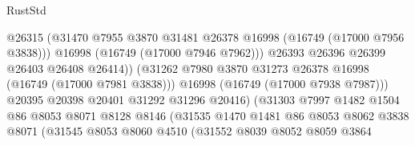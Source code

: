 \begin{lexlean}{RustStd}
\begin{coremodule}
                                          @26315
                                          (@31470
                                            @7955
                                            @3870
                                            @31481
                                            @26378
                                            @16998
                                            (@16749 (@17000 @7956 @3838)))
                                          @16998
                                          (@16749 (@17000 @7946 @7962)))
                                        @26393
                                        @26396
                                        @26399
                                        @26403
                                        @26408
                                        @26414))
                                    (@31262
                                      @7980
                                      @3870
                                      @31273
                                      @26378
                                      @16998
                                      (@16749 (@17000 @7981 @3838)))
                                    @16998
                                    (@16749 (@17000 @7938 @7987)))
                                  @20395
                                  @20398
                                  @20401
                                  @31292
                                  @31296
                                  @20416)
                                (@31303
                                  @7997
                                  @1482
                                  @1504
                                  @86
                                  @8053
                                  @8071
                                  @8128
                                  @8146
                                  (@31535
                                    @1470
                                    @1481
                                    @86
                                    @8053
                                    @8062
                                    @3838
                                    @8071
                                    (@31545
                                      @8053
                                      @8060
                                      @4510
                                      (@31552
                                        @8039
                                        @8052
                                        @8059
                                        @3864

\end{coremodule}
\end{lexlean}
